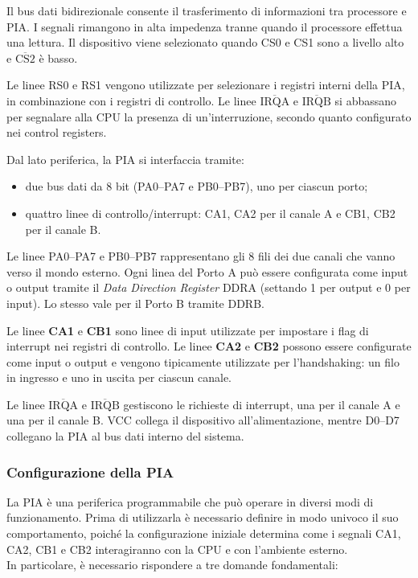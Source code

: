 Il bus dati bidirezionale consente il trasferimento di informazioni tra processore e PIA. 
I segnali rimangono in alta impedenza tranne quando il processore effettua una lettura.  
Il dispositivo viene selezionato quando CS0 e CS1 sono a livello alto e $\overline{\mathrm{CS2}}$ è basso.

Le linee RS0 e RS1 vengono utilizzate per selezionare i registri interni della PIA, in combinazione con i registri di controllo.  
Le linee $\overline{\mathrm{IRQA}}$ e $\overline{\mathrm{IRQB}}$ si abbassano per segnalare alla CPU la presenza di un'interruzione, secondo quanto configurato nei control registers.

Dal lato periferica, la PIA si interfaccia tramite:
\begin{itemize}
    \item due bus dati da 8 bit (PA0--PA7 e PB0--PB7), uno per ciascun porto;
    \item quattro linee di controllo/interrupt: CA1, CA2 per il canale A e CB1, CB2 per il canale B.
\end{itemize}

Le linee PA0--PA7 e PB0--PB7 rappresentano gli 8 fili dei due canali che vanno verso il mondo esterno.  
Ogni linea del Porto A può essere configurata come input o output tramite il \textit{Data Direction Register} DDRA 
(settando 1 per output e 0 per input). Lo stesso vale per il Porto B tramite DDRB.

Le linee \textbf{CA1} e \textbf{CB1} sono linee di input utilizzate per impostare i flag di interrupt nei registri di controllo.  
Le linee \textbf{CA2} e \textbf{CB2} possono essere configurate come input o output e vengono tipicamente utilizzate per 
l’handshaking: un filo in ingresso e uno in uscita per ciascun canale.

Le linee $\overline{\mathrm{IRQA}}$ e $\overline{\mathrm{IRQB}}$ gestiscono le richieste di interrupt, una per il canale A e una per il canale B.  
VCC collega il dispositivo all’alimentazione, mentre D0--D7 collegano la PIA al bus dati interno del sistema.




\subsubsection{Configurazione della PIA}

La PIA è una periferica programmabile che può operare in diversi modi di funzionamento. 
Prima di utilizzarla è necessario definire in modo univoco il suo comportamento, poiché la 
configurazione iniziale determina come i segnali CA1, CA2, CB1 e CB2 interagiranno con la CPU 
e con l’ambiente esterno. \\ In particolare, è necessario rispondere a tre domande fondamentali:

